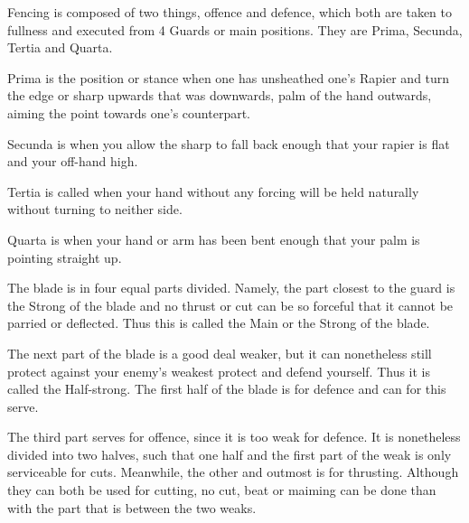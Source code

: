 \newpage


\newpage



Fencing is composed of two things, offence and defence, which both are
taken to fullness and executed from 4 Guards or main
positions. They are Prima, Secunda, Tertia and
Quarta.

Prima is the position or stance when one has unsheathed one's Rapier
and turn the edge or sharp upwards that was downwards, palm of the
hand outwards, aiming the point towards one's counterpart.

Secunda is when you allow the sharp to fall back enough that your
rapier is flat and your off-hand high.

Tertia is called when your hand without any forcing will be held
naturally without turning to neither side.

Quarta is when your hand or arm has been bent enough that your palm is
pointing straight up.


The blade is in four equal parts divided. Namely, the part closest to
the guard is the Strong of the blade and no thrust or cut can be so
forceful that it cannot be parried or deflected. Thus this is called
the Main or the Strong of the blade.

The next part of the blade is a good deal weaker, but it can
nonetheless still protect against your enemy's weakest protect and
defend yourself. Thus it is called the Half-strong. The first half of
the blade is for defence and can for this serve.

The third part serves for offence, since it is too weak for
defence. It is nonetheless divided into two halves, such that one half
and the first part of the weak is only serviceable for
cuts. Meanwhile, the other and outmost is for thrusting. Although they
can both be used for cutting, no cut, beat or maiming can be done than
with the part that is between the two weaks.
